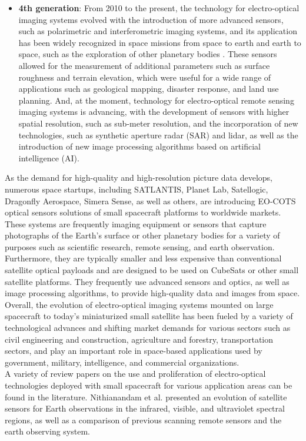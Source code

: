 \documentclass[final,5p,times,twocolumn]{elsarticle}
\begin{document}
\begin{itemize}
	\item \textbf{4th generation}: From 2010 to the present, the technology for electro-optical imaging systems evolved with the introduction of more advanced sensors, such as polarimetric and interferometric imaging systems, and its application has been widely recognized in space missions from space to earth and earth to space, such as the exploration of other planetary bodies \citep{clark2003imaging}. These sensors allowed for the measurement of additional parameters such as surface roughness and terrain elevation, which were useful for a wide range of applications such as geological mapping, disaster response, and land use planning.  And, at the moment, technology for electro-optical remote sensing imaging systems is advancing, with the development of sensors with higher spatial resolution, such as sub-meter resolution, and the incorporation of new technologies, such as synthetic aperture radar (SAR) and lidar, as well as the introduction of new image processing algorithms based on artificial intelligence (AI). 
\end{itemize}
As the demand for high-quality and high-resolution picture data develops, numerous space startups, including SATLANTIS, Planet Lab, Satellogic, Dragonfly Aerospace, Simera Sense, as well as others, are introducing EO-COTS optical sensors solutions of small spacecraft platforms to worldwide markets. These systems are frequently imaging equipment or sensors that capture photographs of the Earth's surface or other planetary bodies for a variety of purposes such as scientific research, remote sensing, and earth observation. Furthermore, they are typically smaller and less expensive than conventional satellite optical payloads and are designed to be used on CubeSats or other small satellite platforms. They frequently use advanced sensors and optics, as well as image processing algorithms, to provide high-quality data and images from space.\\
Overall, the evolution of electro-optical imaging systems mounted on large spacecraft to today's miniaturized small satellite has been fueled by a variety of technological advances and shifting market demands for various sectors such as civil engineering and construction, agriculture and forestry, transportation sectors, and play an important role in space-based applications used by government, military, intelligence, and commercial organizations.\\
A variety of review papers on the use and proliferation of electro-optical technologies deployed with small spacecraft for various application areas can be found in the literature. Nithianandam et al. \citep{JNithianandam_1993} presented an evolution of satellite sensors for Earth observations in the infrared, visible, and ultraviolet spectral regions, as well as a comparison of previous scanning remote sensors and the earth observing system.
\end{document}
